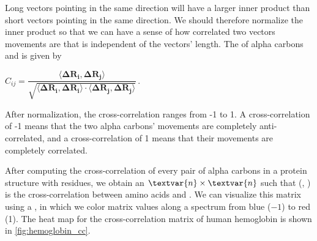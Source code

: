 \begin{note}\end{note}

Long vectors pointing in the same direction will have a larger inner product than short vectors pointing in the same direction. We should therefore normalize the inner product so that we can have a sense of how correlated two vectors movements are that is independent of the vectors' length. The  of alpha carbons  and  is given by

\begin{center}
$ C_{ij} = \dfrac{\langle \mathbf{\Delta R_i}, \mathbf{\Delta R_j} \rangle}{\sqrt{\langle \mathbf{\Delta R_i}, \mathbf{\Delta R_i} \rangle \cdot \langle \mathbf{\Delta R_j}, \mathbf{\Delta R_j} \rangle}}$\,.
\end{center}

After normalization, the cross-correlation ranges from -1 to 1. A cross-correlation of -1 means that the two alpha carbons' movements are completely anti-correlated, and a cross-correlation of 1 means that their movements are completely correlated.

After computing the cross-correlation of every pair of alpha carbons in a protein structure with  residues, we obtain an $\textvar{n} \times \textvar{n}$   such that (, ) is the cross-correlation between amino acids  and . We can visualize this matrix using a , in which we color matrix values along a spectrum from blue ($-1$) to red (1). The heat map for the cross-correlation matrix of human hemoglobin is shown in \autoref{fig:hemoglobin_cc}.

